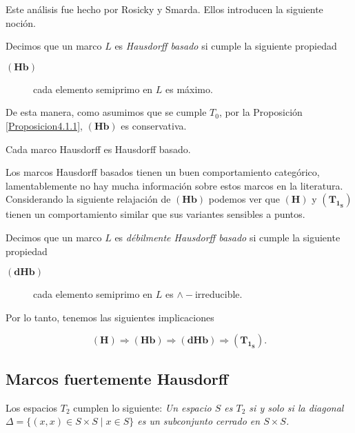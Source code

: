 Este análisis fue hecho por Rosicky y Smarda. Ellos introducen la siguiente noción.

\begin{dfn}
    Decimos que un marco $L$ es \emph{Hausdorff basado} si cumple la siguiente propiedad
    \begin{description}
        \item[$\mathbf{(Hb)}$] cada elemento semiprimo en $L$ es máximo. 
    \end{description}
\end{dfn}

De esta manera, como asumimos que se cumple $T_0$, por la Proposición \ref{Proposicion4.1.1}, $\mathbf{(Hb)}$ es conservativa.

\begin{prop}\label{Proposición4.2}
    Cada marco Hausdorff es Hausdorff basado.
\end{prop}

Los marcos Hausdorff basados tienen un buen comportamiento categórico, lamentablemente no hay mucha información sobre estos marcos en la literatura.\\

Considerando la siguiente relajación de $\mathbf{(Hb)}$ podemos ver que $\mathbf{(H)}$ y $\mathbf{(T_{1_S})}$ tienen un comportamiento similar que sus variantes sensibles a puntos.

\begin{dfn}\label{DHausdorffbasado}
    Decimos que un marco $L$ es \emph{débilmente Hausdorff basado} si cumple la siguiente propiedad
    \begin{description}
        \item[$\mathbf{(dHb)}$] cada elemento semiprimo en $L$ es $\wedge-$irreducible. 
    \end{description}
\end{dfn}

Por lo tanto, tenemos las siguientes implicaciones

\[
\mathbf{(H)}\Rightarrow \mathbf{(Hb)}\Rightarrow \mathbf{(dHb)}\Rightarrow \mathbf{(T_{1_S})}.
\]

\subsection{Marcos fuertemente Hausdorff}

Los espacios $T_2$ cumplen lo siguiente: \emph{Un espacio $S$ es $T_2$ si y solo si la diagonal $\Delta=\{(x,x)\in S\times S\mid x\in S\}$ es un subconjunto cerrado en $S\times S$.}\\

